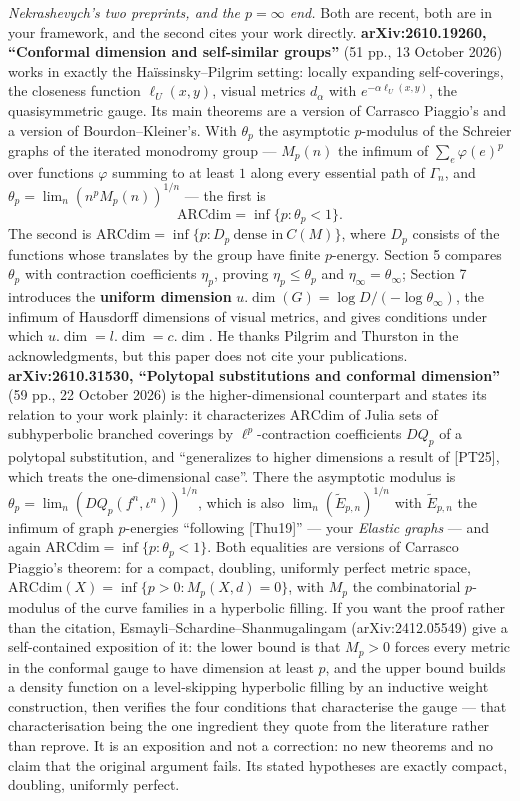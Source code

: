 \documentclass[
]{article}
\begin{document}
\emph{Nekrashevych's two preprints, and the \(p=\infty\) end.} Both are
recent, both are in your framework, and the second cites your work
directly. \textbf{arXiv:2610.19260, ``Conformal dimension and
self-similar groups''} (51 pp., 13 October 2026) works in exactly the
Ha\"{i}ssinsky--Pilgrim setting: locally expanding self-coverings, the
closeness function \(\ell_U(x,y)\), visual metrics \(d_\alpha\) with
\(e^{-\alpha\ell_U(x,y)}\), the quasisymmetric gauge. Its main theorems
are a version of Carrasco Piaggio's and a version of Bourdon--Kleiner's.
With \(\theta_p\) the asymptotic \(p\)-modulus of the Schreier graphs of
the iterated monodromy group --- \(M_p(n)\) the infimum of
\(\sum_e\varphi(e)^p\) over functions \(\varphi\) summing to at least
\(1\) along every essential path of \(\Gamma_n\), and
\(\theta_p=\lim_n (n^pM_p(n))^{1/n}\) --- the first is \[
\mathrm{ARCdim}=\inf\{p:\theta_p<1\}.
\] The second is
\(\mathrm{ARCdim}=\inf\{p:D_p\ \text{dense in}\ C(M)\}\), where \(D_p\)
consists of the functions whose translates by the group have finite
\(p\)-energy. Section 5 compares \(\theta_p\) with contraction
coefficients \(\eta_p\), proving \(\eta_p\le\theta_p\) and
\(\eta_\infty=\theta_\infty\); Section 7 introduces the \textbf{uniform
dimension} \(u.\dim(G)=\log D/(-\log\theta_\infty)\), the infimum of
Hausdorff dimensions of visual metrics, and gives conditions under which
\(u.\dim=l.\dim=c.\dim\). He thanks Pilgrim and Thurston in the
acknowledgments, but this paper does not cite your publications.
\textbf{arXiv:2610.31530, ``Polytopal substitutions and conformal
dimension''} (59 pp., 22 October 2026) is the higher-dimensional
counterpart and states its relation to your work plainly: it
characterizes \(\mathrm{ARCdim}\) of Julia sets of subhyperbolic
branched coverings by \(\ell^p\)-contraction coefficients \(DQ_p\) of a
polytopal substitution, and ``generalizes to higher dimensions a result
of {[}PT25{]}, which treats the one-dimensional case''. There the
asymptotic modulus is \(\theta_p=\lim_n (DQ_p(f^n,\iota^n))^{1/n}\),
which is also \(\lim_n(\tilde E_{p,n})^{1/n}\) with \(\tilde E_{p,n}\)
the infimum of graph \(p\)-energies ``following {[}Thu19{]}'' --- your
\emph{Elastic graphs} --- and again
\(\mathrm{ARCdim}=\inf\{p:\theta_p<1\}\). Both equalities are versions
of Carrasco Piaggio's theorem: for a compact, doubling, uniformly
perfect metric space, \(\mathrm{ARCdim}(X)=\inf\{p>0:M_p(X,d)=0\}\),
with \(M_p\) the combinatorial \(p\)-modulus of the curve families in a
hyperbolic filling. If you want the proof rather than the citation,
Esmayli--Schardine--Shanmugalingam (arXiv:2412.05549) give a
self-contained exposition of it: the lower bound is that \(M_p>0\)
forces every metric in the conformal gauge to have dimension at least
\(p\), and the upper bound builds a density function on a level-skipping
hyperbolic filling by an inductive weight construction, then verifies
the four conditions that characterise the gauge --- that
characterisation being the one ingredient they quote from the literature
rather than reprove. It is an exposition and not a correction: no new
theorems and no claim that the original argument fails. Its stated
hypotheses are exactly compact, doubling, uniformly perfect.
\end{document}

